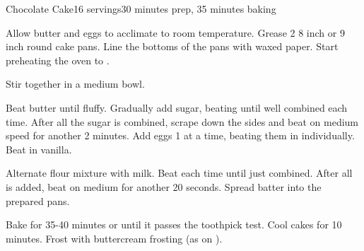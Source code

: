 \documentclass[../Cookbook.tex]{subfiles}
\begin{document}
\begin{recipe}{Chocolate Cake}{16 servings}{30 minutes prep, 35 minutes baking}

Allow butter and eggs to acclimate to room temperature. Grease 2 8 inch or 9  inch round cake pans. Line the bottoms of the pans with waxed paper. Start preheating the oven to .

Stir together in a medium bowl.

Beat butter until fluffy. Gradually add sugar, beating until well combined each time. After all the sugar is combined, scrape down the sides and beat on medium speed for another 2 minutes. Add eggs 1 at a time, beating them in individually. Beat in vanilla.

Alternate flour mixture with milk. Beat each time until just combined. After all is added, beat on medium for another 20 seconds. Spread batter into the prepared pans.

\newstep
Bake for 35-40 minutes or until it passes the toothpick test. Cool cakes for 10 minutes. Frost with buttercream frosting (as on ).

\end{recipe}
\end{document}
